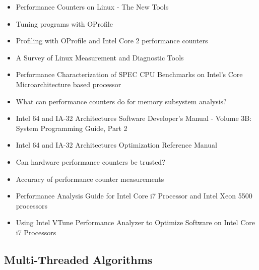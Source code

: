 \begin{itemize}
\item[\textbullet] Performance Counters on Linux - The New Tools
  \cite{Melo2009}
\item[\textbullet] Tuning programs with OProfile \cite{Cohen2004}
\item[\textbullet] Profiling with OProfile and Intel Core 2
  performance counters \cite{Nielsen2008}
\item[\textbullet] A Survey of Linux Measurement and Diagnostic Tools
  \cite{Rowand2009}
\item[\textbullet] Performance Characterization of SPEC CPU Benchmarks
  on Intel's Core Microarchitecture based processor \cite{Bird2007}
\item[\textbullet] What can performance counters do for memory
  subsystem analysis?  \cite{Eranian2008}
\item[\textbullet] Intel \textsuperscript{\textregistered} 64 and
  IA-32 Architectures Software Developer’s Manual - Volume 3B: System
  Programming Guide, Part 2 \cite{Intel2010}
\item[\textbullet] Intel \textsuperscript{\textregistered} 64 and
  IA-32 Architectures Optimization Reference Manual \cite{Intel2009}
\item[\textbullet] Can hardware performance counters be trusted?
  \cite{Weaver2008}
\item[\textbullet] Accuracy of performance counter measurements
  \cite{Zaparanuks2008}
\item[\textbullet] Performance Analysis Guide for Intel
  \textsuperscript{\textregistered} Core
  \textsuperscript{\texttrademark} i7 Processor and Intel
  \textsuperscript{\textregistered} Xeon
  \textsuperscript{\texttrademark} 5500 processors
  \cite{Levinthal2009}
\item[\textbullet] Using Intel \textsuperscript{\textregistered} VTune
  \textsuperscript{\texttrademark} Performance Analyzer to Optimize
  Software on Intel \textsuperscript{\textregistered} Core
  \textsuperscript{\texttrademark} i7 Processors \cite{Intel2009a}
\end{itemize}

\subsection*{Multi-Threaded Algorithms}

